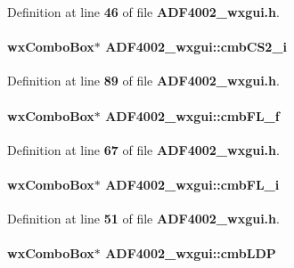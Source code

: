 Definition at line {\bf 46} of file {\bf A\+D\+F4002\+\_\+wxgui.\+h}.

\paragraph[{cmb\+C\+S2\+\_\+i}]{\setlength{\rightskip}{0pt plus 5cm}wx\+Combo\+Box$\ast$ A\+D\+F4002\+\_\+wxgui\+::cmb\+C\+S2\+\_\+i}\label{classADF4002__wxgui_a85f0e3763e9e6b99447459d61f8ee160}


Definition at line {\bf 89} of file {\bf A\+D\+F4002\+\_\+wxgui.\+h}.

\paragraph[{cmb\+F\+L\+\_\+f}]{\setlength{\rightskip}{0pt plus 5cm}wx\+Combo\+Box$\ast$ A\+D\+F4002\+\_\+wxgui\+::cmb\+F\+L\+\_\+f}\label{classADF4002__wxgui_a41a7123cf8dd446b363740f925bf7d82}


Definition at line {\bf 67} of file {\bf A\+D\+F4002\+\_\+wxgui.\+h}.

\paragraph[{cmb\+F\+L\+\_\+i}]{\setlength{\rightskip}{0pt plus 5cm}wx\+Combo\+Box$\ast$ A\+D\+F4002\+\_\+wxgui\+::cmb\+F\+L\+\_\+i}\label{classADF4002__wxgui_a5e26179e17afab22bbeb86f16026488a}


Definition at line {\bf 51} of file {\bf A\+D\+F4002\+\_\+wxgui.\+h}.

\paragraph[{cmb\+L\+DP}]{\setlength{\rightskip}{0pt plus 5cm}wx\+Combo\+Box$\ast$ A\+D\+F4002\+\_\+wxgui\+::cmb\+L\+DP}\label{classADF4002__wxgui_a3904fda9611e98dbfaf25080e91a7235}



